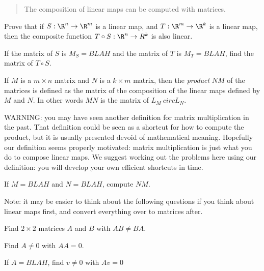 \documentclass{article}
\begin{document}
\begin{abstract}
  The composition of linear maps can be computed with matrices.
\end{abstract}

	\begin{question}
		Prove that if $S:\R^n \to \R^m$ is a linear map, and $T:\R^m \to \R^k$ is a linear map, then the composite function $T\circ S:\R^n \to R^k$ is also linear.
	\end{question}
	
	\begin{question}
		If the matrix of $S$ is $M_S = BLAH$ and the matrix of $T$ is $M_T = BLAH$, find the matrix of $T \circ S$.
	\end{question}
	
	\begin{definition}
		If $M$ is a $m\times n$ matrix and $N$ is a $k \times m$ matrix, then the \textit{product} $NM$ of the matrices is
		defined as the matrix of the composition of the linear maps defined by $M$ and $N$.  In other words  $MN$ is the matrix of 
		$L_M\ circ L_N$.
	\end{definition}
	
	WARNING:  you may have seen another definition for matrix multiplication in the past.  That definition could be seen as a shortcut for how
	to compute the product, but it is usually presented devoid of mathematical meaning.  Hopefully our definition seems properly motivated:  matrix multiplication is 
	just what you do to compose linear maps.  We suggest working out the problems here using our definition:  you will develop your own efficient shortcuts in time.
	
	\begin{question}
		If $M = BLAH$ and $N=BLAH$, compute $NM$.
	\end{question}
	
	Note:  it may be easier to think about the following questions if you think about linear maps first, and convert everything over to matrices after.
	
	\begin{question}
		Find $2\times 2$ matrices $A$ and $B$ with $AB \neq BA$.
	\end{question}
	
	\begin{question}
		Find $A \neq 0$  with $AA = 0$.
	\end{question}
	
	\begin{question}
		If $A = BLAH$, find $v \neq 0$ with $Av = 0$ 
	\end{question}
	
\end{document}
